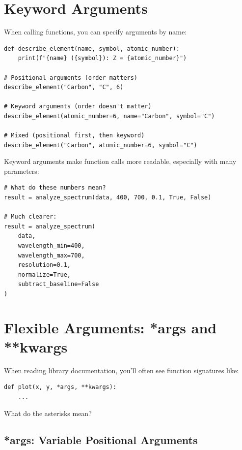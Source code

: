 \section{Keyword Arguments}
\label{sec:keyword-args}

When calling functions, you can specify arguments by name:

\begin{lstlisting}
def describe_element(name, symbol, atomic_number):
    print(f"{name} ({symbol}): Z = {atomic_number}")

# Positional arguments (order matters)
describe_element("Carbon", "C", 6)

# Keyword arguments (order doesn't matter)
describe_element(atomic_number=6, name="Carbon", symbol="C")

# Mixed (positional first, then keyword)
describe_element("Carbon", atomic_number=6, symbol="C")
\end{lstlisting}

Keyword arguments make function calls more readable, especially with many parameters:

\begin{lstlisting}
# What do these numbers mean?
result = analyze_spectrum(data, 400, 700, 0.1, True, False)

# Much clearer:
result = analyze_spectrum(
    data,
    wavelength_min=400,
    wavelength_max=700,
    resolution=0.1,
    normalize=True,
    subtract_baseline=False
)
\end{lstlisting}

\section{Flexible Arguments: *args and **kwargs}
\label{sec:args-kwargs}

When reading library documentation, you'll often see function signatures like:

\begin{lstlisting}
def plot(x, y, *args, **kwargs):
    ...
\end{lstlisting}

What do the asterisks mean?

\subsection{*args: Variable Positional Arguments}

